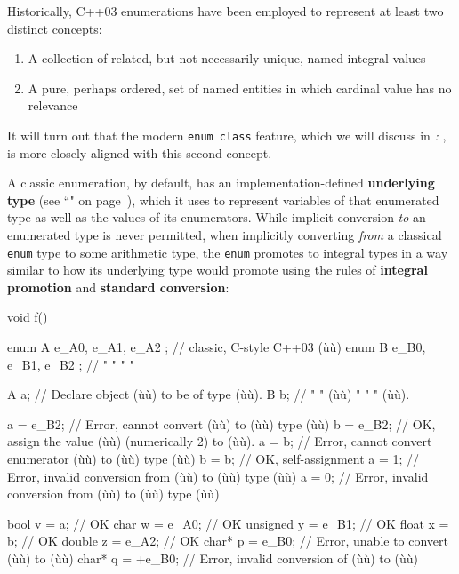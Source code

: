 Historically, C++03 enumerations have been employed to represent at
least two distinct concepts:

\begin{enumerate}
\item{A collection of related, but not necessarily unique, named integral values}
\item{A pure, perhaps ordered, set of named entities in which cardinal value has no relevance}
\end{enumerate}

\noindent It will turn out that the modern \texttt{enum}~\texttt{class} feature,
which we will discuss in \textit{: }, is more closely aligned with this second
concept.

A classic enumeration, by default, has an implementation-defined
\textbf{underlying type} (see ``" on page~\pageref{explicit-enumeration-underlying-type}), which it uses to represent
variables of that enumerated type as well as the values of its
enumerators. While implicit conversion \emph{to} an enumerated type is
never permitted, when implicitly converting \emph{from} a classical
\texttt{enum} type to some arithmetic type, the \texttt{enum} promotes
to integral types in a way similar to how its underlying type would
promote using the rules of \textbf{integral promotion} and
\textbf{standard conversion}:

\begin{emcppslisting}
void f()
{
    enum A { e_A0, e_A1, e_A2 };  // classic, C-style C++03 (ù{}ù)
    enum B { e_B0, e_B1, e_B2 };  //    "       "       "     "

    A a;  // Declare object (ù{}ù) to be of type (ù{}ù).
    B b;  //   "       "    (ù{}ù)  " "  "       (ù{}ù).

    a = e_B2;  // Error, cannot convert (ù{}ù) to (ù{}ù) type (ù{}ù)
    b = e_B2;  // OK, assign the value (ù{}ù) (numerically 2) to (ù{}ù).
    a = b;     // Error, cannot convert enumerator (ù{}ù) to (ù{}ù) type (ù{}ù)
    b = b;     // OK, self-assignment
    a = 1;     // Error, invalid conversion from (ù{}ù) to (ù{}ù) type (ù{}ù)
    a = 0;     // Error, invalid conversion from (ù{}ù) to (ù{}ù) type (ù{}ù)

    bool     v = a;     // OK
    char     w = e_A0;  // OK
    unsigned y = e_B1;  // OK
    float    x = b;     // OK
    double   z = e_A2;  // OK
    char*    p = e_B0;  // Error, unable to convert (ù{}ù) to (ù{}ù)
    char*    q = +e_B0; // Error, invalid conversion of (ù{}ù) to (ù{}ù)
}
\end{emcppslisting}

